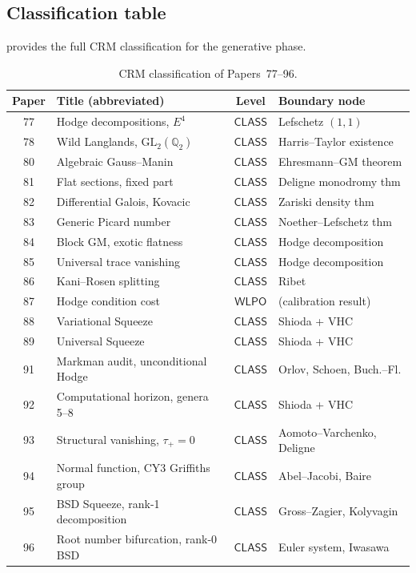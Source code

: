 \documentclass[11pt]{article}
\theoremstyle{plain}
\theoremstyle{definition}
\theoremstyle{remark}
\newcommand{\QQ}{\mathbb{Q}}
\newcommand{\GL}{\mathrm{GL}}
\newcommand{\WLPO}{\mathsf{WLPO}}
\newcommand{\CLASS}{\mathsf{CLASS}}
\begin{document}
\subsection{Classification table}

 provides the full CRM classification
for the generative phase.

\begin{table}[ht]
\centering
\small
\caption{CRM classification of Papers~77--96.}\label{tab:crm-classification}
\begin{tabular}{@{}clcl@{}}
\toprule
Paper & Title (abbreviated) & Level & Boundary node \\
\midrule
77 & Hodge decompositions, $E^4$ & $\CLASS$ & Lefschetz $(1,1)$ \\
78 & Wild Langlands, $\GL_2(\QQ_2)$ & $\CLASS$ & Harris--Taylor existence \\
80 & Algebraic Gauss--Manin & $\CLASS$ & Ehresmann--GM theorem \\
81 & Flat sections, fixed part & $\CLASS$ & Deligne monodromy thm \\
82 & Differential Galois, Kovacic & $\CLASS$ & Zariski density thm \\
83 & Generic Picard number & $\CLASS$ & Noether--Lefschetz thm \\
84 & Block GM, exotic flatness & $\CLASS$ & Hodge decomposition \\
85 & Universal trace vanishing & $\CLASS$ & Hodge decomposition \\
86 & Kani--Rosen splitting & $\CLASS$ & Ribet \\
87 & Hodge condition cost & $\WLPO$ & (calibration result) \\
88 & Variational Squeeze & $\CLASS$ & Shioda + VHC \\
89 & Universal Squeeze & $\CLASS$ & Shioda + VHC \\
91 & Markman audit, unconditional Hodge & $\CLASS$ & Orlov, Schoen, Buch.--Fl. \\
92 & Computational horizon, genera 5--8 & $\CLASS$ & Shioda + VHC \\
93 & Structural vanishing, $\tau_+ = 0$ & $\CLASS$ & Aomoto--Varchenko, Deligne \\
94 & Normal function, CY3 Griffiths group & $\CLASS$ & Abel--Jacobi, Baire \\
95 & BSD Squeeze, rank-1 decomposition & $\CLASS$ & Gross--Zagier, Kolyvagin \\
96 & Root number bifurcation, rank-0 BSD & $\CLASS$ & Euler system, Iwasawa \\
\bottomrule
\end{tabular}
\end{table}
\end{document}
